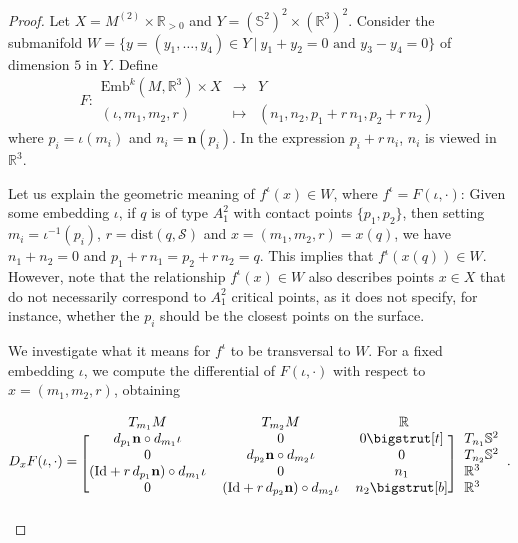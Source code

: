 \documentclass[11pt]{article}
\newcommand{\R}{\mathbb{R}}
\newcommand{\io}{\iota}
\newcommand{\nbf}{\mathbf{n}}
\newcommand{\Emb}{\mathrm{Emb}^k(M,\R^3)}
\newcommand{\dist}{\mathrm{dist}}
\newcommand{\Surf}{\mathcal{S}}
\newcommand{\Id}{\mathrm{Id}}
\newcommand\topstrut[1][1.2ex]{\setlength\bigstrutjot{#1}{\bigstrut[t]}}
\newcommand\botstrut[1][1.2ex]{\setlength\bigstrutjot{#1}{\bigstrut[b]}}
\theoremstyle{plain}
\theoremstyle{definition}
\theoremstyle{remark}
\begin{document}
\begin{proof}
Let $X = M^{(2)} \times \R_{>0}$ and $Y = (\mathbb{S}^2)^2 \times (\R^3)^2$. Consider the submanifold $W = \{y = (y_1,\ldots, y_4)\in Y ~|~ y_1 + y_2 = 0 \text{ and } y_3 - y_4 = 0 \}$ of dimension $5$ in $Y$.
Define 
\begin{equation}
F:
\begin{array}{ccc}
\Emb \times X & \to & Y \\
(\io, m_1,m_2,r) & \mapsto & (n_1, n_2, p_1 + r \, n_1, p_2 + r \, n_2 )
\end{array}
\end{equation}
where $p_i = \io(m_i)$ and $n_i = \nbf(p_i)$. In the expression $p_i + r \, n_i$, $n_i$ is viewed in $\R^3$.

Let us explain the geometric meaning of $f^\io(x) \in W$, where $f^\io = F(\io,\cdot)$:
Given some embedding $\io$, if $q$ is of type $A_1^2$ with contact points $\{p_1,p_2\}$, then setting $m_i = \io^{-1}(p_i)$, $r = \dist(q, \Surf)$ and $x = (m_1,m_2,r) = x(q)$, we have $n_1 + n_2 = 0$ and $p_1 + r \, n_1 = p_2 + r \, n_2 = q$. This implies that $f^\io(x(q)) \in W$. However, note that the relationship $f^\io(x) \in W$ also describes points $x \in X$ that do not necessarily correspond to $A_1^2$ critical points, as it does not specify, for instance, whether the $p_i$ should be the closest points on the surface. 

We investigate what it means for $f^\io$ to be transversal to $W$.
For a fixed embedding $\io$, we compute the differential of $F(\iota, \cdot)$ with respect to $x = (m_1,m_2,r)$, obtaining

\begin{equation*}
	D_x F(\io, \cdot) =
	\begin{blockarray}{*{3}{c} l}
		\begin{block}{cccl}
			T_{m_1} M & T_{m_2} M & ~~\R~~ & \\
		\end{block}
		\begin{block}{[ccc] l}
			d_{p_1} \nbf \circ d_{m_1} \io & 0 & 0  \topstrut  & T_{n_1} \mathbb{S}^2 \\
			0 & d_{p_2} \nbf \circ d_{m_2} \io & 0 & T_{n_2} \mathbb{S}^2   \\
			(\Id + r \, d_{p_1} \nbf) \circ d_{m_1} \io & 0 & n_1 & \R^3 \\
			0 & (\Id + r \, d_{p_2} \nbf) \circ d_{m_2} \io & n_2 \botstrut & \R^3  \\
		\end{block}
	\end{blockarray}.
\end{equation*}



\end{proof}
\end{document}
